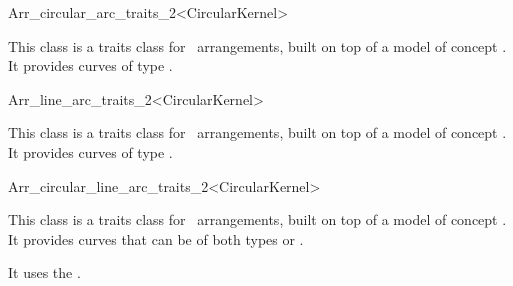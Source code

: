 \begin{ccRefClass}{Arr_circular_arc_traits_2<CircularKernel>}


\ccDefinition

This class is a traits class for \cgal\ arrangements, built on top of a model of 
concept .
It provides curves of type .

\ccIsModel
{}

\end{ccRefClass}
\begin{ccRefClass}{Arr_line_arc_traits_2<CircularKernel>}


\ccDefinition

This class is a traits class for \cgal\ arrangements, built on top of a
model of concept .  It provides curves of type
.

\ccIsModel
{}

\end{ccRefClass}
\begin{ccRefClass}{Arr_circular_line_arc_traits_2<CircularKernel>}


\ccDefinition

This class is a traits class for \cgal\ arrangements, built on top of a
model of concept . It provides curves that can be
of both types
 or 
.

It uses the . 

\ccIsModel
{}

\end{ccRefClass}
